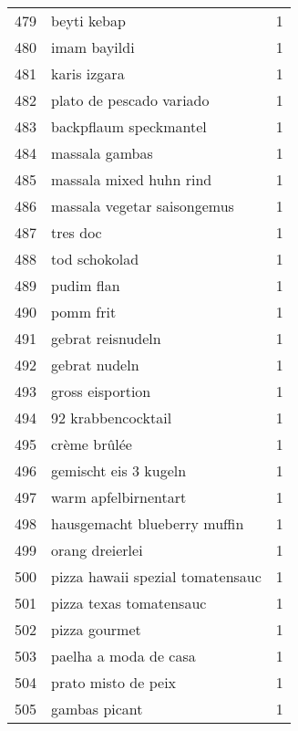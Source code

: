\begin{tabular}{llr}
479 &                                        beyti kebap &      1 \\
480 &                                       imam bayildi &      1 \\
481 &                                       karis izgara &      1 \\
482 &                           plato de pescado variado &      1 \\
483 &                             backpflaum speckmantel &      1 \\
484 &                                     massala gambas &      1 \\
485 &                            massala mixed huhn rind &      1 \\
486 &                        massala vegetar saisongemus &      1 \\
487 &                                           tres doc &      1 \\
488 &                                      tod schokolad &      1 \\
489 &                                         pudim flan &      1 \\
490 &                                          pomm frit &      1 \\
491 &                                  gebrat reisnudeln &      1 \\
492 &                                      gebrat nudeln &      1 \\
493 &                                   gross eisportion &      1 \\
494 &                                 92 krabbencocktail &      1 \\
495 &                                       crème brûlée &      1 \\
496 &                              gemischt eis 3 kugeln &      1 \\
497 &                               warm apfelbirnentart &      1 \\
498 &                       hausgemacht blueberry muffin &      1 \\
499 &                                    orang dreierlei &      1 \\
500 &                   pizza hawaii spezial tomatensauc &      1 \\
501 &                            pizza texas tomatensauc &      1 \\
502 &                                      pizza gourmet &      1 \\
503 &                              paelha a moda de casa &      1 \\
504 &                                prato misto de peix &      1 \\
505 &                                      gambas picant &      1 \\
\bottomrule
\end{tabular}
